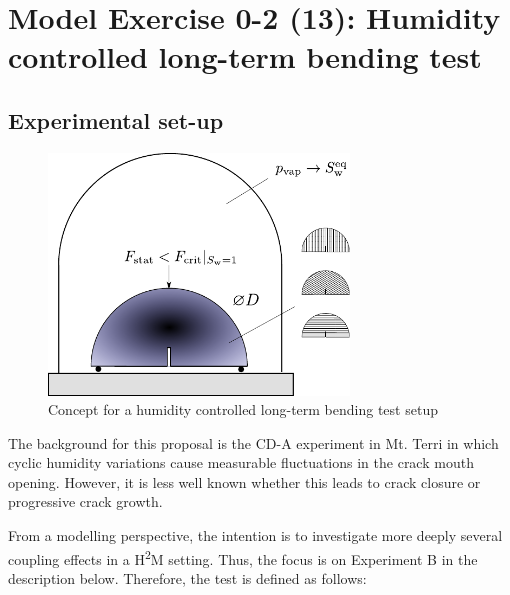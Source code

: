 \section{Model Exercise 0-2 (13): Humidity controlled long-term bending test}
\label{sec:mex13}
\subsection{Experimental set-up}
\begin{figure}
\centering
\includegraphics[width=8cm]{figures/GeomInt_MEx13.pdf}
\caption{Concept for a humidity controlled long-term bending test setup}
\label{fig:GeomInt_MEx13}
\end{figure}
The background for this proposal is the CD-A experiment in Mt. Terri in which cyclic humidity variations cause measurable fluctuations in the crack mouth opening. However, it is less well known whether this leads to crack closure or progressive crack growth. 

From a modelling perspective, the intention is to investigate more deeply several coupling effects in a H\textsuperscript{2}M setting. Thus, the focus is on Experiment B in the description below. Therefore, the test is defined as follows:

